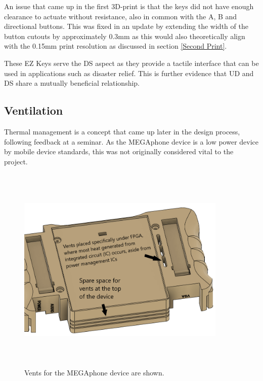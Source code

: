 An issue that came up in the first 3D-print is that the keys did not have enough clearance to actuate without resistance, also in common with the A, B and directional buttons.
This was fixed in an update by extending the width of the button cutouts by approximately 0.3mm as this would also theoretically align with the 0.15mm print resolution as discussed in section \ref{Second Print}. %

These EZ Keys serve the DS aspect as they provide a tactile interface that can be used in applications such as disaster relief.
This is further evidence that UD and DS share a mutually beneficial relationship.

\subsection{Ventilation} \label{Vents}

Thermal management is a concept that came up later in the design process, following feedback at a seminar.
As the MEGAphone device is a low power device by mobile device standards, this was not originally considered vital to the project.

\begin{figure} [h]
    \centering
    \includegraphics[width=10cm,height=10cm,keepaspectratio]{Figures/ventilation.png}
    \caption{Vents for the MEGAphone device are shown.}
    \label{fig:Vents}
\end{figure}

